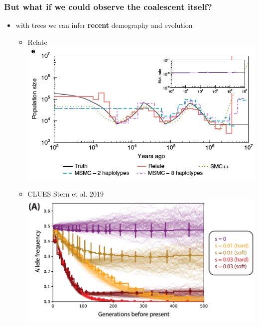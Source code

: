 \documentclass{beamer}
\begin{document}
\begin{frame}
	\frametitle{But what if we could observe the coalescent itself?}

	\begin{itemize}
		\item with trees we can infer \textbf{recent} demography and evolution \pause
		\begin{itemize}
			\item Relate\\
				\includegraphics[width=0.5\linewidth]{../images/relate_ne.png} \pause
			\item CLUES {\tiny Stern et al. 2019}\\
				\includegraphics[width=0.75\linewidth]{../images/clues.png}
		\end{itemize}
	\end{itemize}

\end{frame}

\end{document}
